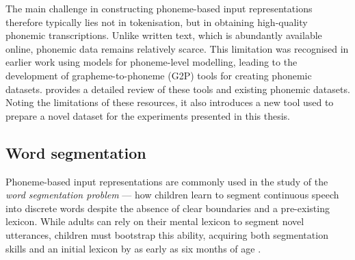 The main challenge in constructing phoneme-based input representations therefore typically lies not in tokenisation, but in obtaining high-quality phonemic transcriptions. Unlike written text, which is abundantly available online, phonemic data remains relatively scarce. This limitation was recognised in earlier work using \ngram models for phoneme-level modelling, leading to the development of grapheme-to-phoneme (G2P) tools for creating phonemic datasets.  provides a detailed review of these tools and existing phonemic datasets. Noting the limitations of these resources, it also introduces a new tool used to prepare a novel dataset for the experiments presented in this thesis.


\subsection{Word segmentation}\label{sec:12-wordseg}

Phoneme-based input representations are commonly used in the study of the \emph{word segmentation problem} --- how children learn to segment continuous speech into discrete words despite the absence of clear boundaries and a pre-existing lexicon. While adults can rely on their mental lexicon to segment novel utterances, children must bootstrap this ability, acquiring both segmentation skills and an initial lexicon by as early as six months of age \citep{Jusczyk1999infants}.


